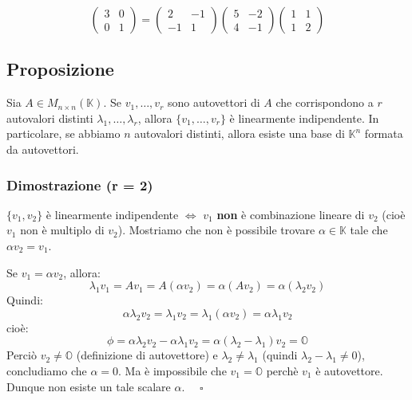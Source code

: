 \documentclass[a4paper]{article}
\theoremstyle{break}
\theoremstyle{break}
\theoremstyle{break}
\theoremstyle{break}
\begin{document}
\begin{example}
  \[
  \begin{pmatrix} 
    3 & 0\\
    0 & 1
  \end{pmatrix} 
  =
  \begin{pmatrix} 
    2 & -1\\
    -1 & 1
  \end{pmatrix} 
  \begin{pmatrix} 
    5 & -2\\
    4 & -1
  \end{pmatrix} 
  \begin{pmatrix} 
    1 & 1\\
    1 & 2
  \end{pmatrix} 
  \] 
\end{example}

\subsection{Proposizione}
\label{9.8}
Sia \( A \in M_{n \times n}(\mathbb{K}) \). Se \( v_1, \ldots, v_r \) sono autovettori
di \( A \) che corrispondono a \( r \) autovalori distinti \( \lambda_1, \ldots, \lambda_r \),
allora \( \{v_1, \ldots, v_r\}  \) è linearmente indipendente. In particolare,
se abbiamo \( n \) autovalori distinti, allora esiste una base di \( \mathbb{K}^n \) 
formata da autovettori.

\subsubsection{Dimostrazione (r = 2)}
\( \{v_1,v_2\}  \) è linearmente indipendente \( \iff \) \( v_1 \) \textbf{non} è
combinazione lineare di \( v_2 \) (cioè \( v_1 \) non è multiplo di \( v_2 \)). Mostriamo
che non è possibile trovare \( \alpha \in \mathbb{K} \) tale che \( \alpha v_2 = v_1 \).

\vspace{1em}
\noindent Se \( v_1 = \alpha v_2 \), allora:
\[
\lambda_1 v_1 = Av_1 = A(\alpha v_2) = \alpha(A v_2) = \alpha(\lambda_2 v_2)
\] 
Quindi:
\[
\alpha \lambda_2 v_2 = \lambda_1 v_2 = \lambda_1 (\alpha v_2) = \alpha \lambda_1 v_2
\] 
cioè:
\[
\phi = \alpha \lambda_2 v_2 - \alpha \lambda_1 v_2 = \alpha(\lambda_2 - \lambda_1) v_2 = \mathbb{O}
\] 
Perciò \( v_2 \neq \mathbb{O} \) (definizione di autovettore) e \( \lambda_2 \neq \lambda_1 \) 
(quindi \( \lambda_2 - \lambda_1 \neq 0 \)), concludiamo che \( \alpha=0 \). Ma
è impossibile che \( v_1 = \mathbb{O} \) perchè \( v_1 \) è autovettore.
Dunque non esiste un tale scalare \( \alpha \). \( \quad \square \) 
\end{document}
